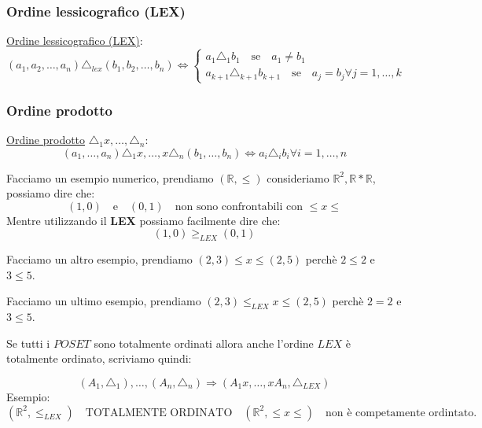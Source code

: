 \documentclass{article}
\begin{document}
\subsubsection{Ordine lessicografico (LEX)}
\underline{Ordine lessicografico (LEX)}:
\[ 
(a_1,a_2,\ldots, a_n) \triangle_{lex} (b_1,b_2,\ldots, b_n) \Leftrightarrow   
\begin{cases}
        a_1 \triangle_1 b_1 \quad \mbox{se} \quad  a_1 \not = b_1 \\
        a_{k+1} \triangle_{k+1} b_{k+1} \quad \mbox{se} \quad  a_j = b_j \forall j = 1,\ldots, k
\end{cases}
\]


\subsubsection{Ordine prodotto}
\underline{Ordine prodotto} $\triangle_1x,\ldots,\triangle_n$:
\begin{equation*}
        (a_1,\ldots,a_n) \triangle_1x,\ldots, x\triangle_n(b_1,\ldots,b_n) \Leftrightarrow a_i \triangle_i b_i \forall i = 1,\ldots,n
\end{equation*}

Facciamo un esempio numerico, prendiamo $(\mathbb{R}, \le)$ consideriamo $\mathbb{R}^2, \mathbb{R}*\mathbb{R}$, possiamo dire che:
\begin{equation*}
        (1, 0) \quad \mbox{e} \quad (0,1) \quad \mbox{non sono confrontabili con $\le x \le$}
\end{equation*}
Mentre utilizzando il \textbf{LEX} possiamo facilmente dire che:
\begin{equation*}
        (1, 0) \ge_{LEX} (0,1)
\end{equation*}

Facciamo un altro esempio, prendiamo $(2,3) \le x \le(2,5)$ perchè $2 \le 2$ e $3 \le 5$. \par
Facciamo un ultimo esempio, prendiamo $(2,3) \le_{LEX} x \le(2,5)$ perchè $2 = 2$ e $3 \le 5$. \newline

Se tutti i $POSET$ sono totalmente ordinati allora anche l'ordine $LEX$ è totalmente ordinato, scriviamo quindi:

\begin{equation*}
        (A_1,\triangle_1), \ldots, (A_n, \triangle_n) \Rightarrow (A_1x,\ldots,xA_n,\triangle_{LEX})
\end{equation*}
Esempio:
\begin{equation*}
        (\mathbb{R}^2, \le_{LEX}) \quad \mbox{TOTALMENTE ORDINATO} \quad (\mathbb{R}^2, \le x \le) \quad \mbox{non è competamente ordintato}. 
\end{equation*}
\end{document}

